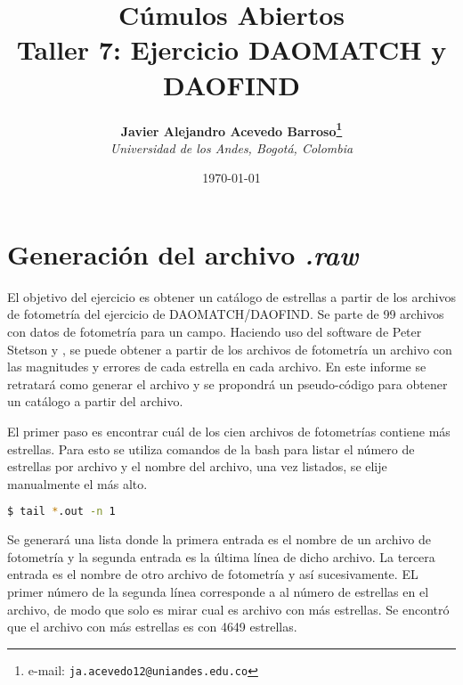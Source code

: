 \documentclass[12pt]{article}
\begin{document}
\title{Cúmulos Abiertos \\ Taller 7: Ejercicio DAOMATCH y DAOFIND}

\author{
\textbf{Javier Alejandro Acevedo Barroso\thanks{e-mail: \texttt{ja.acevedo12@uniandes.edu.co}}}\\
\textit{Universidad de los Andes, Bogotá, Colombia}\\
 }%

\date{\today}
\maketitle %


\normalsize
\newpage




\section{Generación del archivo \emph{.raw}}
El objetivo del ejercicio es obtener un catálogo de estrellas a partir de los archivos de fotometría del ejercicio de DAOMATCH/DAOFIND. Se parte de 99 archivos con datos de fotometría para un campo. Haciendo uso del software de Peter Stetson  y , se puede obtener a partir de los archivos de fotometría un archivo  con las magnitudes y errores de cada estrella en cada archivo. En este informe se retratará como generar el archivo  y se propondrá un pseudo-código para obtener un catálogo a partir del archivo.

El primer paso es encontrar cuál de los cien archivos de fotometrías contiene más estrellas. Para esto se utiliza comandos de la bash para listar el número de estrellas por archivo y el nombre del archivo, una vez listados, se elije manualmente el más alto.

\begin{lstlisting}[language=bash]
  $ tail *.out -n 1
\end{lstlisting}

Se generará una lista donde la primera entrada es el nombre de un archivo de fotometría y la segunda entrada es la última línea de dicho archivo. La tercera entrada es el nombre de otro archivo de fotometría y así sucesivamente. EL primer número de la segunda línea corresponde a al número de estrellas en el archivo, de modo que solo es mirar  cual es archivo con más estrellas. Se encontró que el archivo con más estrellas es  con 4649 estrellas.
\end{document}
